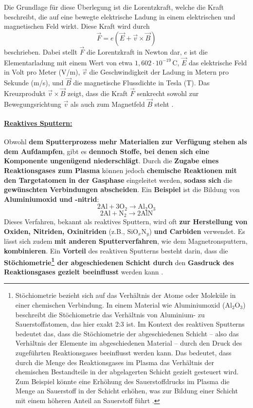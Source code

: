 \documentclass{article} %
\begin{document}
Die Grundlage für diese Überlegung ist die Lorentzkraft, welche die Kraft beschreibt, die auf eine bewegte elektrische Ladung in einem elektrischen und 
magnetischen Feld wirkt. Diese Kraft wird durch
$$
\vec{F} = e (\vec{E} + \vec{v} \times \vec{B})
$$
beschrieben. Dabei stellt \( \vec{F} \) die Lorentzkraft in Newton dar, \( e \) ist die Elementarladung mit einem Wert von etwa 
\( 1{,}602 \cdot 10^{-19} \, \mathrm{C} \), \( \vec{E} \) das elektrische Feld in Volt pro Meter (V/m), \( \vec{v} \) die Geschwindigkeit der
Ladung in Metern pro Sekunde (m/s), und \( \vec{B} \) die magnetische Flussdichte in Tesla (T). Das Kreuzprodukt \( \vec{v} \times \vec{B} \) 
zeigt, dass die Kraft \( \vec{F} \) senkrecht sowohl zur Bewegungsrichtung \( \vec{v} \) als auch zum Magnetfeld \( \vec{B} \) steht \cite{rossnagel2003magnetron, 
mattox2010handbook, anders2010advances, kouznetsov1999new, prechtl2005grundlagen}. 

\vspace{1em}
\paragraph{\uline{Reaktives Sputtern:}} Obwohl \textbf{dem Sputterprozess mehr Materialien zur Verfügung stehen als dem Aufdampfen}, gibt es \textbf{dennoch 
Stoffe, bei denen sich eine Komponente ungenügend niederschlägt}. Durch die \textbf{Zugabe eines Reaktionsgases zum Plasma} können jedoch \textbf{chemische 
Reaktionen mit den Targetatomen in der Gasphase} eingeleitet werden, \textbf{sodass sich} die \textbf{gewünschten Verbindungen abscheiden}. Ein \textbf{Beispiel} 
ist die Bildung von \textbf{Aluminiumoxid und -nitrid}:
$$
\mathrm{2Al} + \mathrm{3O}_2 \rightarrow \mathrm{Al}_2\mathrm{O}_3
$$
$$
\mathrm{2Al} + \mathrm{N}_2 \rightarrow \mathrm{2AlN}
$$
Dieses Verfahren, bekannt als reaktives Sputtern, wird oft \textbf{zur Herstellung von Oxiden, Nitriden, Oxinitriden} (z.B., \(\mathrm{SiO}_x\mathrm{N}_y\)) 
\textbf{und Carbiden} verwendet. Es lässt sich zudem \textbf{mit anderen Sputterverfahren}, wie dem Magnetronsputtern, \textbf{kombinieren}. Ein \textbf{Vorteil} 
des reaktiven Sputterns besteht darin, dass die \textbf{Stöchiometrie\footnote{Stöchiometrie bezieht sich auf das Verhältnis der Atome oder Moleküle in einer 
chemischen Verbindung. In einem Material wie Aluminiumoxid (\(\mathrm{Al}_2\mathrm{O}_3\)) beschreibt die Stöchiometrie das Verhältnis von Aluminium- zu 
Sauerstoffatomen, das hier exakt 2:3 ist. Im Kontext des reaktiven Sputterns bedeutet das, dass die Stöchiometrie der abgeschiedenen Schicht -- also das 
Verhältnis der Elemente im abgeschiedenen Material -- durch den Druck des zugeführten Reaktionsgases beeinflusst werden kann. Das bedeutet, dass durch die Menge 
des Reaktionsgases im Plasma das Verhältnis der chemischen Bestandteile in der abgelagerten Schicht gezielt gesteuert wird. Zum Beispiel könnte eine Erhöhung des 
Sauerstoffdrucks im Plasma die Menge an Sauerstoff in der Schicht erhöhen, was zur Bildung einer Schicht mit einem höheren Anteil an Sauerstoff führt 
\cite{anders2010reactive, ohring2002, mattox2010handbook, rossnagel2003magnetron}.} der abgeschiedenen Schicht durch} den \textbf{Gasdruck des Reaktionsgases 
gezielt beeinflusst} werden kann \cite{keplinger2024}.
\end{document}
